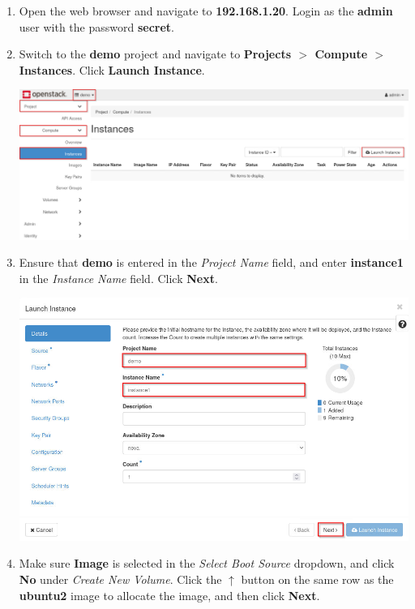 \documentclass[letterpaper, 12pt]{article}
\begin{document}
\begin{enumerate}
    \item Open the web browser and navigate to \textbf{192.168.1.20}.
    Login as the \textbf{admin} user with the password \textbf{secret}.

    \item Switch to the \textbf{demo} project and navigate to \textbf{Projects $>$ Compute $>$ Instances}.
    Click \textbf{Launch Instance}.

    \begin{center}
        \includegraphics[width=\linewidth]{images/part4/step2.png}
    \end{center}

    \item Ensure that \textbf{demo} is entered in the \textit{Project Name} field, and enter \textbf{instance1} in the \textit{Instance Name} field.
    Click \textbf{Next}.

    \begin{center}
        \includegraphics[width=\linewidth]{images/part4/step3.png}
    \end{center}

    \item Make sure \textbf{Image} is selected in the \textit{Select Boot Source} dropdown, and click \textbf{No} under \textit{Create New Volume}.
    Click the $\uparrow$ button on the same row as the \textbf{ubuntu2} image to allocate the image, and then click \textbf{Next}.


\end{enumerate}
\end{document}
